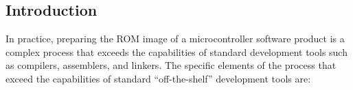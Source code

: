 \chapter{\cdaazerolongtitle{}}

\label{cdaa0}


\section{Introduction}

In practice, preparing the ROM image of a microcontroller software product
is a complex process that exceeds the capabilities of standard development
tools such as compilers, assemblers, and linkers.  The specific 
elements of the process that exceed the capabilities of standard ``off-the-shelf''
development tools are:

